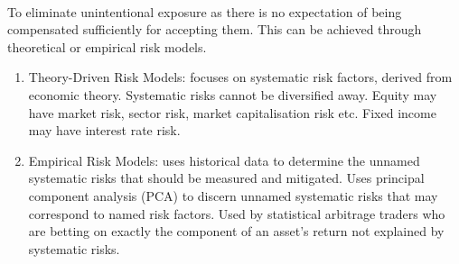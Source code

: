 \documentclass[a4paper,oneside,openany]{book}
\begin{document}
\begin{method} \\
To eliminate unintentional exposure as there is no expectation of being compensated sufficiently for accepting them. This can be achieved through theoretical or empirical risk models.
\begin{enumerate}[label=\roman*.]
\setlength{\itemsep}{0pt}
\item Theory-Driven Risk Models: focuses on systematic risk factors, derived from economic theory. Systematic risks cannot be diversified away. Equity may have market risk, sector risk, market capitalisation risk etc. Fixed income may have interest rate risk.
\item Empirical Risk Models: uses historical data to determine the unnamed systematic risks that should be measured and mitigated. Uses principal component analysis (PCA) to discern unnamed systematic risks that may correspond to named risk factors. Used by statistical arbitrage traders who are betting on exactly the component of an asset's return not explained by systematic risks.
\end{enumerate}
\end{method}
\end{document}
